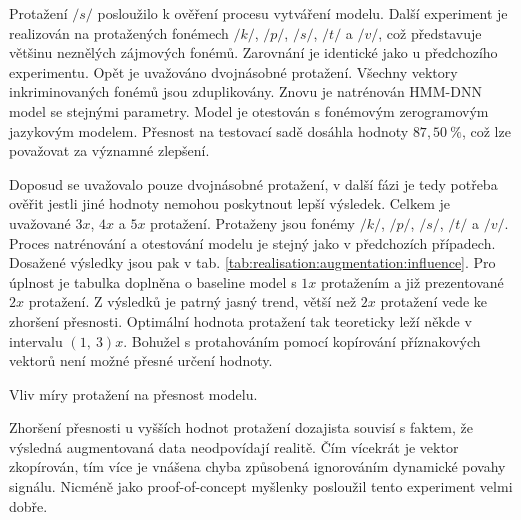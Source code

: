 Protažení $/s/$ posloužilo k ověření procesu vytváření modelu. Další experiment je realizován na protažených fonémech $/k/$, $/p/$, $/s/$, $/t/$ a $/v/$, což představuje většinu neznělých zájmových fonémů. Zarovnání je identické jako u předchozího experimentu. Opět je uvažováno dvojnásobné protažení. Všechny vektory inkriminovaných fonémů jsou zduplikovány. Znovu je natrénován HMM-DNN model se stejnými parametry. Model je otestován s fonémovým zerogramovým jazykovým modelem. Přesnost na testovací sadě dosáhla hodnoty $87,50\ \%$, což lze považovat za významné zlepšení.

Doposud se uvažovalo pouze dvojnásobné protažení, v další fázi je tedy potřeba ověřit jestli jiné hodnoty nemohou poskytnout lepší výsledek. Celkem je uvažované $3x$, $4x$ a $5x$ protažení. Protaženy jsou fonémy $/k/$, $/p/$, $/s/$, $/t/$ a $/v/$. Proces natrénování a otestování modelu je stejný jako v předchozích případech. Dosažené výsledky jsou pak v tab. \ref{tab:realisation:augmentation:influence}. Pro úplnost je tabulka doplněna o baseline model s $1x$ protažením a již prezentované $2x$ protažení. Z výsledků je patrný jasný trend, větší než $2x$ protažení vede ke zhoršení přesnosti. Optimální hodnota protažení tak teoreticky leží někde v intervalu $\left(1,\ 3\right)x$. Bohužel s protahováním pomocí kopírování příznakových vektorů není možné přesné určení hodnoty.

\begin{table}[htpb]
  \centering
  \def\arraystretch{1.5}
  \caption{Vliv míry protažení na přesnost modelu.}
  \label{tab:realisation:augmentation:influence}
\end{table}

Zhoršení přesnosti u vyšších hodnot protažení dozajista souvisí s faktem, že výsledná augmentovaná data neodpovídají realitě. Čím vícekrát je vektor zkopírován, tím více je vnášena chyba způsobená ignorováním dynamické povahy signálu. Nicméně jako proof-of-concept myšlenky posloužil tento experiment velmi dobře.

